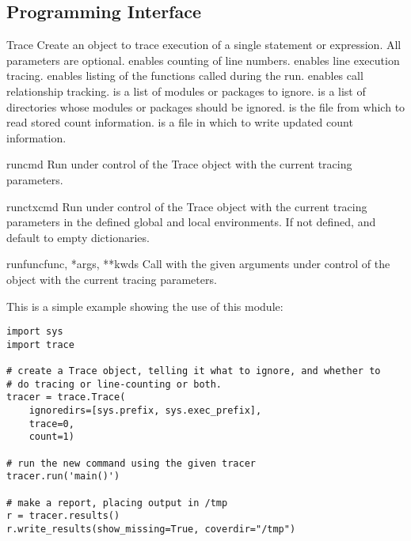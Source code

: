 \subsection{Programming Interface\label{trace-api}}

\begin{classdesc}{Trace}{}
Create an object to trace execution of a single statement or expression.
All parameters are optional.   enables counting of line numbers.
 enables line execution tracing.   enables
listing of the functions called during the run.   enables
call relationship tracking.   is a list of modules or
packages to ignore.   is a list of directories whose modules
or packages should be ignored.   is the file from which to read
stored count information.   is a file in which to write updated
count information.
\end{classdesc}

\begin{methoddesc}[Trace]{run}{cmd}
Run  under control of the Trace object with the current tracing
parameters.
\end{methoddesc}

\begin{methoddesc}[Trace]{runctx}{cmd}
Run  under control of the Trace object with the current tracing
parameters in the defined global and local environments.  If not defined,
 and  default to empty dictionaries.
\end{methoddesc}

\begin{methoddesc}[Trace]{runfunc}{func, *args, **kwds}
Call  with the given arguments under control of the
 object with the current tracing parameters.
\end{methoddesc}

This is a simple example showing the use of this module:

\begin{verbatim}
import sys
import trace

# create a Trace object, telling it what to ignore, and whether to
# do tracing or line-counting or both.
tracer = trace.Trace(
    ignoredirs=[sys.prefix, sys.exec_prefix],
    trace=0,
    count=1)

# run the new command using the given tracer
tracer.run('main()')

# make a report, placing output in /tmp
r = tracer.results()
r.write_results(show_missing=True, coverdir="/tmp")
\end{verbatim}
